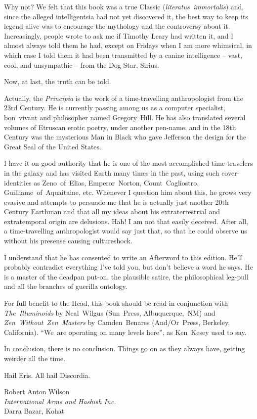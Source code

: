 Why not? We felt that this book was a true Classic
(\textit{literatus~immortalis}) and, since the alleged intelligentsia
had not yet discovered it, the best way to keep its legend alive was
to encourage the mythology and the controversy about it. Increasingly,
people wrote to ask me if Timothy Leary had written it, and I almost
always told them he had, except on Fridays when I am more whimsical,
in which case I told them it had been transmitted by a canine
intelligence -- vast, cool, and unsympathic -- from the Dog Star,
Sirius.

Now, at last, the truth can be told.

Actually, the \textit{Principia} is the work of a time-travelling
anthropologist from the 23rd Century. He is currently passing among us
as a computer specialist, bon~vivant and philosopher named
Gregory~Hill. He has also translated several volumes of Etruscan
erotic poetry, under another pen-name,
and in the 18th Century was the mysterious Man in Black who gave
Jefferson the design for the Great Seal of the United States.

I have it on good authority that he is one of the most accomplished
time-travelers in the galaxy and has visited Earth many times in the
past, using such cover-identities as Zeno~of~Elias,
Emperor~Norton, Count~Cagliostro,
Guilliame~of~Aquaitaine, etc. Whenever I question him about this, he
grows very evasive and attempts to persuade me that he is actually
just another 20th Century Earthman and that all my ideas about his
extraterrestrial and extratemporal origin are delusions. Hah! I am not
that easily deceived. After all, a time-travelling anthropologist
would say just that, so that he could observe us without his presense
causing cultureshock.

I understand that he has consented to write an Afterword to this
edition. He'll probably contradict everything I've told you, but don't
believe a word he says. He is a master of the deadpan
put-on, the plausible satire, the philosophical leg-pull and all the
branches of guerilla ontology.

For full benefit to the Head, this book should be read in conjunction
with \textit{The~Illuminoids} by Neal~Wilgus (Sun~Press,
Albuquerque,~NM) and \textit{Zen~Without~Zen~Masters} by
Camden~Benares (And/Or~Press, Berkeley, California). ``We~are
operating on many levels here'', as Ken~Kesey used to say.

In conclusion, there is no conclusion. Things go on as they always
have, getting weirder all the time.

Hail Eris. All hail Discordia.

\begin{blockattribution}
Robert Anton Wilson \\
\textit{International Arms and Hashish Inc.} \\
Darra Bazar, Kohat
\end{blockattribution}
